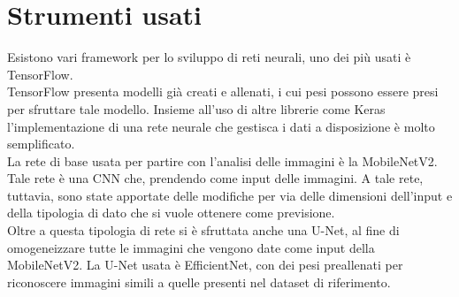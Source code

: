\chapter{Strumenti usati}
\label{ch:Strumenti usati}

Esistono vari framework per lo sviluppo di reti neurali, uno dei più usati è TensorFlow. 
\\
TensorFlow presenta modelli già creati e allenati, i cui pesi possono essere presi per sfruttare tale modello.
Insieme all'uso di altre librerie come Keras l'implementazione di una rete neurale che gestisca i dati a disposizione 
è molto semplificato.
\\
La rete di base usata per partire con l'analisi delle immagini è la MobileNetV2. Tale rete è una CNN che, prendendo come input delle 
immagini.
A tale rete, tuttavia, sono state apportate delle modifiche per via delle dimensioni dell'input e della tipologia di dato 
che si vuole ottenere come previsione.
\\
Oltre a questa tipologia di rete si è sfruttata anche una U-Net, al fine di omogeneizzare tutte le immagini che vengono date come input della MobileNetV2.
La U-Net usata è EfficientNet, con dei pesi preallenati per riconoscere immagini simili a quelle presenti nel dataset di riferimento.

